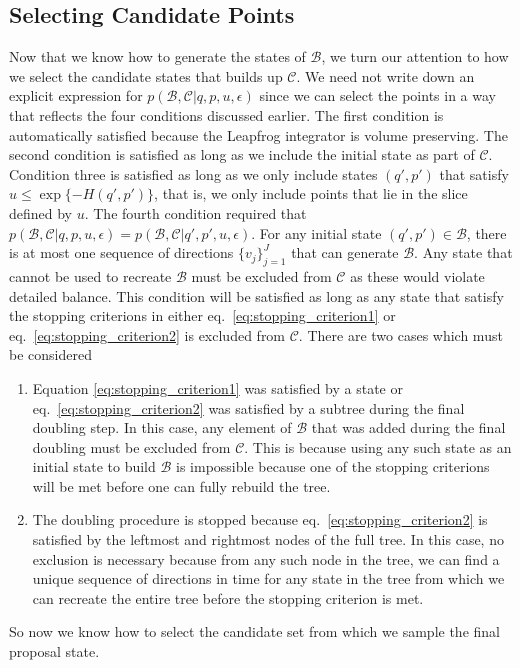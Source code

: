 \subsection{Selecting Candidate Points}
Now that we know how to generate the states of $\mathcal{B}$, we turn our attention to how we select the candidate states that builds up $\mathcal{C}$. 
We need not write down an explicit expression for $p(\mathcal{B}, \mathcal{C}|q, p, u, \epsilon)$ since we can select the points in a way that reflects the four conditions discussed earlier. The first condition is automatically satisfied because the Leapfrog integrator is volume preserving. The second condition is satisfied as long as we include the initial state as part of $\mathcal{C}$. Condition three is satisfied as long as we only include states $(q', p')$ that satisfy $u \leq \exp\{-H(q', p')\}$, that is, we only include points that lie in the slice defined by $u$. The fourth condition required that $p(\mathcal{B}, \mathcal{C}|q, p, u, \epsilon) = p(\mathcal{B}, \mathcal{C}|q', p', u, \epsilon)$. For any initial state $(q', p') \in \mathcal{B}$, there is at most one sequence of directions $\{v_j\}_{j=1}^J$ that can generate $\mathcal{B}$. Any state that cannot be used to recreate $\mathcal{B}$ must be excluded from $\mathcal{C}$ as these would violate detailed balance. This condition will be satisfied as long as any state that satisfy the stopping criterions in either eq.~\eqref{eq:stopping_criterion1} or eq.~\eqref{eq:stopping_criterion2} is excluded from $\mathcal{C}$. There are two cases which must be considered
\begin{enumerate}
    \item Equation \eqref{eq:stopping_criterion1} was satisfied by a state or eq.~\eqref{eq:stopping_criterion2} was satisfied by a subtree during the final doubling step. In this case, any element of $\mathcal{B}$ that was added during the final doubling must be excluded from $\mathcal{C}$. This is because using any such state as an initial state to build $\mathcal{B}$ is impossible because one of the stopping criterions will be met before one can fully rebuild the tree.
    \item The doubling procedure is stopped because eq.~\eqref{eq:stopping_criterion2} is satisfied by the leftmost and rightmost nodes of the full tree. In this case, no exclusion is necessary because from any such node in the tree, we can find a unique sequence of directions in time for any state in the tree from which we can recreate the entire tree before the stopping criterion is met.
\end{enumerate}
So now we know how to select the candidate set from which we sample the final proposal state. 

